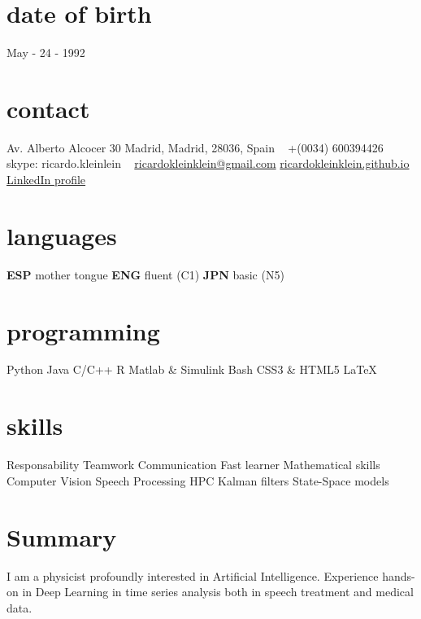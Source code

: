 \documentclass[]{friggeri-cv-a4}
\begin{document}


\begin{aside} %
\section{date of birth}
May - 24 - 1992
\section{contact}
Av. Alberto Alcocer 30
Madrid, Madrid, 28036,
Spain
~
+(0034) 600394426
skype: ricardo.kleinlein
~
{\scriptsize \href{mailto:ricardokleinklein@gmail.com}{ricardokleinklein@gmail.com} }
{\scriptsize \href{https://ricardokleinklein.github.io}{ricardokleinklein.github.io} }
{\small \href{https://www.linkedin.com/in/rfaundezcarrasco}{LinkedIn profile} }
\section{languages}
\textbf{ESP} mother tongue
\textbf{ENG} fluent (C1)
\textbf{JPN} basic (N5)
\section{programming}
Python
Java
C/C++
R
Matlab \& Simulink
Bash
CSS3 \& HTML5
\LaTeX
\section{skills}
Responsability
Teamwork
Communication
Fast learner
Mathematical skills
Computer Vision
Speech Processing
HPC
Kalman filters
State-Space models
\end{aside}

\section{Summary}
I am a physicist profoundly interested in Artificial Intelligence. Experience hands-on in Deep Learning in time series analysis both in speech treatment and medical data.
\end{document}
